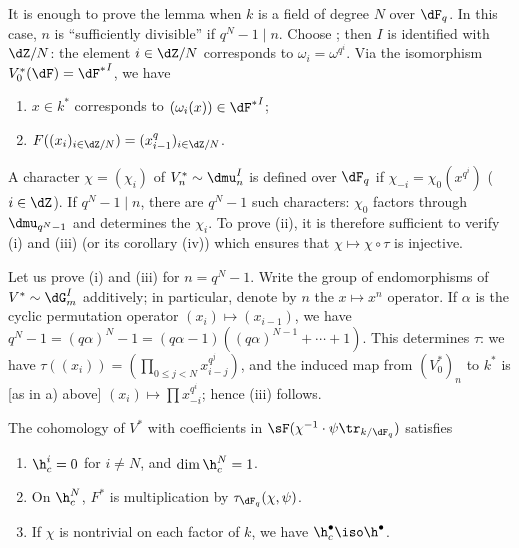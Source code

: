 It is enough to prove the lemma when $k$ is a field of degree $N$ over 
$\dF_q$. In this case, $n$ is ``sufficiently divisible'' if $q^N-1\mid n$. 
Choose ; then $I$ is identified 
with $\dZ/N$: the element $i\in \dZ/N$ corresponds to $\omega_i=\omega^{q^i}$. Via 
the isomorphism $V_0^\ast(\dF) = {\dF^\ast}^I$, we have 
\begin{enumerate}[\indent a)]
  \item $x\in k^\ast$ corresponds to $(\omega_i(x))\in {\dF^\ast}^I$; 
  \item $F((x_i)_{i\in \dZ/N})=(x_{i-1}^q)_{i\in \dZ/N}$. 
\end{enumerate}

A character $\chi=(\chi_i)$ of $V_n^\ast\sim \dmu_n^I$ is defined over 
$\dF_q$ if $\chi_{-i} =\chi_0(x^{q^i})$ ($i\in \dZ$). If $q^N-1\mid n$, there are 
$q^N-1$ such characters: $\chi_0$ factors through $\dmu_{q^N-1}$ and 
determines the $\chi_i$. To prove (ii), it is therefore sufficient to verify (i) 
and (iii) (or its corollary (iv)) which ensures that $\chi\mapsto \chi\circ \tau$ 
is injective. 

Let us prove (i) and (iii) for $n=q^N-1$. Write the group of 
endomorphisms of $V^\ast\sim \dG_m^I$ additively; in particular, denote by $n$ 
the $x\mapsto x^n$ operator. If $\alpha$ is the cyclic permutation operator 
$(x_i)\mapsto (x_{i-1})$, we have 
$q^N-1=(q\alpha)^N-1 = (q\alpha-1)((q\alpha)^{N-1}+\cdots + 1)$. This 
determines $\tau$: we have $\tau((x_i)) = (\prod_{0\leqslant j<N} x_{i-j}^{q^j})$, 
and the induced map from $(V_0^\ast)_n$ to $k^\ast$ is [as in a) above] 
$(x_i)\mapsto \prod x_{-i}^{q^i}$; hence (iii) follows. 





\begin{proposition_}\label{VI:4-10}
The cohomology of $V^\ast$ with coefficients in 
$\sF(\chi^{-1}\cdot \psi\tr_{k/\dF_q})$ satisfies 
\begin{enumerate}[\indent (i)]
  \item $\h_c^i = 0$ for $i\ne N$, and $\dim \h_c^N=1$. 
  \item On $\h_c^N$, $F^\ast$ is multiplication by 
    $\tau_{\dF_q}(\chi,\psi)$. 
  \item If $\chi$ is nontrivial on each factor of $k$, we have 
    $\h_c^\bullet \iso \h^\bullet$. 
\end{enumerate}
\end{proposition_}


